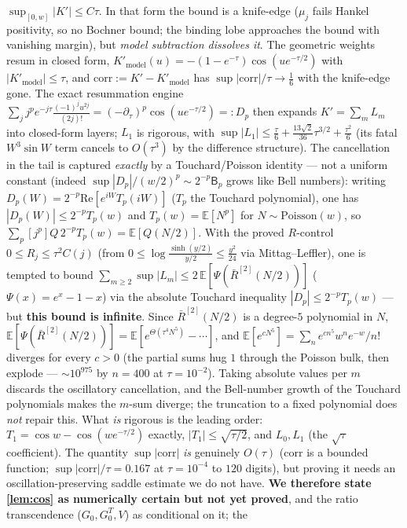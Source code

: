 \documentclass[11pt,a4paper]{article}
\theoremstyle{remark}
\theoremstyle{plain}
\begin{document}
$\sup_{[0,w]}|K'| \le C\tau$.  In that form the bound is a knife-edge
($\mu_j$ fails Hankel positivity, so no Bochner bound; the binding lobe
approaches the bound with vanishing margin), but \emph{model subtraction
dissolves it}.  The geometric weights resum in closed form,
$K'_{\mathrm{model}}(u) = -(1-e^{-\tau})\cos(u e^{-\tau/2})$ with
$|K'_{\mathrm{model}}|\le\tau$, and $\mathrm{corr}:=K'-K'_{\mathrm{model}}$ has
$\sup|\mathrm{corr}|/\tau\to\tfrac16$ with the knife-edge gone.  The exact
resummation engine $\sum_j j^p e^{-j\tau}\tfrac{(-1)^j u^{2j}}{(2j)!} =
(-\partial_\tau)^p\cos(u e^{-\tau/2}) =: D_p$ then expands $K' = \sum_m L_m$
into closed-form layers; $L_1$ is rigorous, with $\sup|L_1|\le \tfrac\tau6 +
\tfrac{13\sqrt2}{36}\tau^{3/2} + \tfrac{\tau^2}6$ (its fatal $W^3\sin W$ term
cancels to $O(\tau^3)$ by the difference structure).  The cancellation in the
tail is captured \emph{exactly} by a Touchard/Poisson identity --- not a
uniform constant (indeed $\sup|D_p|/(w/2)^p\sim 2^{-p}\mathsf B_p$ grows like
Bell numbers): writing $D_p(W)=2^{-p}\mathrm{Re}[e^{iW}T_p(iW)]$ ($T_p$ the
Touchard polynomial), one has $|D_p(W)|\le 2^{-p}T_p(w)$ and $T_p(w) =
\mathbb E[N^p]$ for $N\sim\mathrm{Poisson}(w)$, so $\sum_p[j^p]Q\,2^{-p}T_p(w)
= \mathbb E[Q(N/2)]$.  With the proved $R$-control $0\le R_j\le\tau^2 C(j)$
(from $0\le\log\tfrac{\sinh(y/2)}{y/2}\le\tfrac{y^2}{24}$ via Mittag--Leffler),
one is tempted to bound $\sum_{m\ge2}\sup|L_m|\le 2\,\mathbb E[\Psi(\bar R^{[2]}(N/2))]$
($\Psi(x)=e^x{-}1{-}x$) via the absolute Touchard inequality $|D_p|\le2^{-p}T_p(w)$ ---
but \textbf{this bound is infinite}.  Since $\bar R^{[2]}(N/2)$ is a degree-$5$
polynomial in $N$, $\mathbb E[\Psi(\bar R^{[2]}(N/2))]=\mathbb E[e^{\Theta(\tau^4N^5)}{-}\cdots]$,
and $\mathbb E[e^{cN^5}]=\sum_n e^{cn^5}w^ne^{-w}/n!$ diverges for every $c>0$ (the partial
sums hug $1$ through the Poisson bulk, then explode --- $\sim10^{975}$ by $n=400$ at
$\tau=10^{-2}$).  Taking absolute values per $m$ discards the oscillatory cancellation,
and the Bell-number growth of the Touchard polynomials makes the $m$-sum diverge; the
truncation to a fixed polynomial does \emph{not} repair this.  What \emph{is} rigorous
is the leading order: $T_1=\cos w-\cos(we^{-\tau/2})$ exactly, $|T_1|\le\sqrt{\tau/2}$,
and $L_0,L_1$ (the $\sqrt\tau$ coefficient).  The quantity $\sup|\mathrm{corr}|$ \emph{is}
genuinely $O(\tau)$ ($\mathrm{corr}$ is a bounded function; $\sup|\mathrm{corr}|/\tau=0.167$
at $\tau=10^{-4}$ to $120$ digits), but proving it needs an oscillation-preserving saddle
estimate we do not have.  \textbf{We therefore state \eqref{lem:cos} as numerically certain
but not yet proved}, and the ratio transcendence ($G_0,G^T_0,V$) as conditional on it; the
\end{document}
